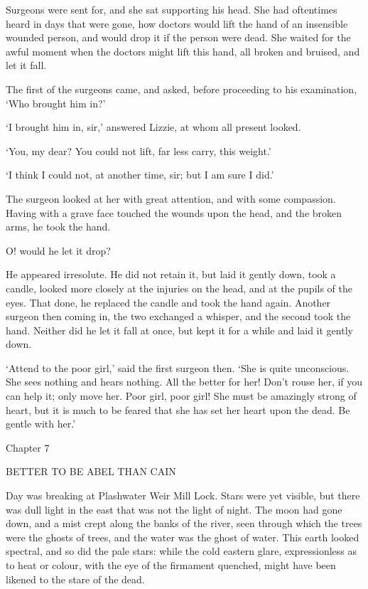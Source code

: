 Surgeons were sent for, and she sat supporting his head. She had
oftentimes heard in days that were gone, how doctors would lift the hand
of an insensible wounded person, and would drop it if the person were
dead. She waited for the awful moment when the doctors might lift this
hand, all broken and bruised, and let it fall.

The first of the surgeons came, and asked, before proceeding to his
examination, ‘Who brought him in?’

‘I brought him in, sir,’ answered Lizzie, at whom all present looked.

‘You, my dear? You could not lift, far less carry, this weight.’

‘I think I could not, at another time, sir; but I am sure I did.’

The surgeon looked at her with great attention, and with some
compassion. Having with a grave face touched the wounds upon the head,
and the broken arms, he took the hand.

O! would he let it drop?

He appeared irresolute. He did not retain it, but laid it gently down,
took a candle, looked more closely at the injuries on the head, and at
the pupils of the eyes. That done, he replaced the candle and took the
hand again. Another surgeon then coming in, the two exchanged a whisper,
and the second took the hand. Neither did he let it fall at once, but
kept it for a while and laid it gently down.

‘Attend to the poor girl,’ said the first surgeon then. ‘She is quite
unconscious. She sees nothing and hears nothing. All the better for
her! Don’t rouse her, if you can help it; only move her. Poor girl, poor
girl! She must be amazingly strong of heart, but it is much to be feared
that she has set her heart upon the dead. Be gentle with her.’



Chapter 7

BETTER TO BE ABEL THAN CAIN


Day was breaking at Plashwater Weir Mill Lock. Stars were yet visible,
but there was dull light in the east that was not the light of night.
The moon had gone down, and a mist crept along the banks of the river,
seen through which the trees were the ghosts of trees, and the water
was the ghost of water. This earth looked spectral, and so did the
pale stars: while the cold eastern glare, expressionless as to heat or
colour, with the eye of the firmament quenched, might have been likened
to the stare of the dead.

